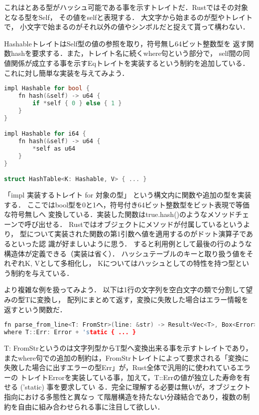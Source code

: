 これはとある型がハッシュ可能である事を示すトレイトだ．Rustではその対象となる型をSelf，
その値をselfと表現する．
大文字から始まるのが型やトレイトで，
小文字で始まるのがそれ以外の値やシンボルだと捉えて貰って構わない．

HashableトレイトはSelf型の値の参照を取り，符号無し64ビット整数型を
返す関数hashを要求する．また，トレイト名に続くwhere句という部分で，
self間の同値関係が成立する事を示すEqトレイトを実装するという制約を追加している．
これに対し簡単な実装を与えてみよう．

\begin{lstlisting}[language={C++},caption=トレイトの実装と利用例,label=hash_use]
impl Hashable for bool {
    fn hash(&self) -> u64 {
        if *self { 0 } else { 1 }
    }
}

impl Hashable for i64 {
    fn hash(&self) -> u64 {
        *self as u64
    }
}

struct HashTable<K: Hashable, V> { ... }
\end{lstlisting}

「impl 実装するトレイト for 対象の型」 という構文内に関数や追加の型を実装する．
ここではbool型を0と1へ，符号付き64ビット整数型をビット表現で等価な符号無しへ
変換している．実装した関数はtrue.hash()のようなメソッドチェーンで呼び出せる．
Rustではオブジェクトにメソッドが付属しているというより，
型について実装された関数の第1引数へ値を適用するのがドット演算子であるといった認
識が好ましいように思う．
すると利用例として最後の行のような構造体が定義できる（実装は省く）．
ハッシュテーブルのキーと取り扱う値をそれぞれK, Vとして多相化し，
Kについてはハッシュとしての特性を持つ型という制約を与えている．

より複雑な例を扱ってみよう．
以下は1行の文字列を空白文字の類で分割して望みの型Tに変換し，
配列にまとめて返す，変換に失敗した場合はエラー情報を返すという関数だ．

\begin{lstlisting}[language={C++},caption=トレイトの複合, label=trait_cmpl]
fn parse_from_line<T: FromStr>(line: &str) -> Result<Vec<T>, Box<Error>>
where T::Err: Error + 'static { ... }
\end{lstlisting}

T: FromStrというのは文字列型からT型へ変換出来る事を示すトレイトであり，
またwhere句での追加の制約は，FromStrトレイトによって要求される「変換に
失敗した場合に出すエラーの型Err」が，Rust全体で汎用的に使われているエラーの
トレイトErrorを実装している事，加えて，T::Errの値が独立した寿命を有せる ('static) 事を要求してい
る．完全に理解する必要は無いが，オブジェクト指向における多態性と異なっ
て階層構造を持たない分疎結合であり，複数の制約を自由に組み合わせられる事に注目して欲しい．


